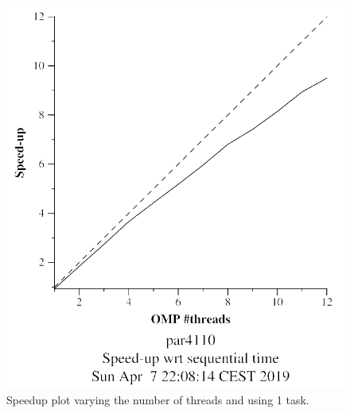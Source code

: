 \documentclass[12pt, a4paper]{article}
\begin{document}
\begin{figure}[H]
\begin{minipage}[t]{0.48\linewidth}
  \includegraphics[scale=0.5]{./mandel-omp-10000-strong-omp-24-1-speedup}
  \caption{Speedup plot varying the number of threads and using 1 task.}
  \label{fig:mandel-omp-10000-strong-omp-24-1-speedup}
\end{minipage}
\end{figure}
\end{document}

